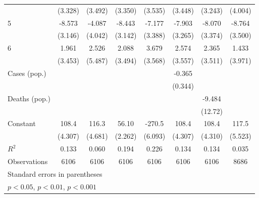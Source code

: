 \documentclass{article}
\begin{document}
{\begin{longtable}{l*{7}{c}}
                &  (3.328)         &  (3.492)         &  (3.350)         &  (3.535)         &  (3.448)         &  (3.243)         &  (4.004)         \\
5               &   -8.573\sym{**} &   -4.087         &   -8.443\sym{*}  &   -7.177\sym{*}  &   -7.903\sym{*}  &   -8.070\sym{*}  &   -8.764\sym{*}  \\
                &  (3.146)         &  (4.042)         &  (3.142)         &  (3.388)         &  (3.265)         &  (3.374)         &  (3.500)         \\
6               &    1.961         &    2.526         &    2.088         &    3.679         &    2.574         &    2.365         &    1.433         \\
                &  (3.453)         &  (5.487)         &  (3.494)         &  (3.568)         &  (3.557)         &  (3.511)         &  (3.971)         \\
Cases (pop.)    &                  &                  &                  &                  &   -0.365         &                  &                  \\
                &                  &                  &                  &                  &  (0.344)         &                  &                  \\
Deaths (pop.)   &                  &                  &                  &                  &                  &   -9.484         &                  \\
                &                  &                  &                  &                  &                  &  (12.72)         &                  \\
Constant        &    108.4\sym{***}&    116.3\sym{***}&    56.10\sym{***}&   -270.5\sym{***}&    108.4\sym{***}&    108.4\sym{***}&    117.5\sym{***}\\
                &  (4.307)         &  (4.681)         &  (2.262)         &  (6.093)         &  (4.307)         &  (4.310)         &  (5.523)         \\
\hline
\(R^{2}\)       &    0.133         &    0.060         &    0.194         &    0.226         &    0.134         &    0.134         &    0.035         \\
Observations    &     6106         &     6106         &     6106         &     6106         &     6106         &     6106         &     8686         \\
\hline\hline
\multicolumn{8}{l}{\footnotesize Standard errors in parentheses}\\
\multicolumn{8}{l}{\footnotesize \sym{*} \(p<0.05\), \sym{**} \(p<0.01\), \sym{***} \(p<0.001\)}\\
\end{longtable}
}
\end{document}
